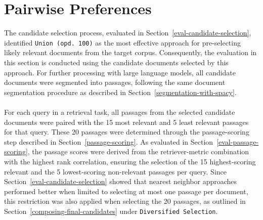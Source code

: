 \section{Pairwise Preferences}\label{eval-pairwise-preferences}

The candidate selection process, evaluated in Section~\ref{eval-candidate-selection}, identified \linebreak \mbox{\texttt{Union (opd.\ 100)}} as the most effective approach for pre-selecting likely relevant documents from the target corpus. Consequently, the evaluation in this section is conducted using the candidate documents selected by this approach. For further processing with large language models, all candidate documents were segmented into passages, following the same document segmentation \mbox{procedure} as described in Section~\ref{segmentation-with-spacy}.
\\\\
For each query in a retrieval task, all passages from the selected candidate documents were paired with the 15 most relevant and 5 least relevant passages for that query. These 20 passages were determined through the passage-scoring step described in Section~\ref{passage-scoring}. As evaluated in Section~\ref{eval-passage-scoring}, the passage scores were derived from the retriever-metric combination with the highest rank correlation, ensuring the selection of the 15 highest-scoring relevant and the 5 lowest-scoring non-relevant passages per query. Since Section~\ref{eval-candidate-selection} showed that nearest neighbor approaches performed better when limited to selecting at most one passage per document, this restriction was also applied when selecting the 20 passages, as outlined in Section~\ref{composing-final-candidates} under \texttt{Diversified Selection}.
